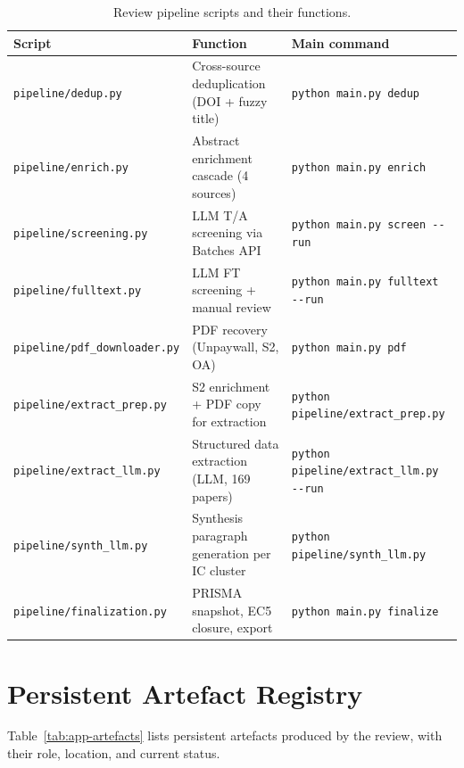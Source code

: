\begin{table}[htbp]
\centering
\caption{Review pipeline scripts and their functions.}
\label{tab:app-pipeline}
\small
\setlength{\tabcolsep}{3pt}
\begin{tabular}{p{3.5cm} p{4.0cm} p{5.2cm}}
\toprule
\textbf{Script} & \textbf{Function} & \textbf{Main command} \\
\midrule
\texttt{pipeline/dedup.py} &
  Cross-source deduplication (DOI + fuzzy title) &
  \texttt{python main.py dedup} \\
\texttt{pipeline/enrich.py} &
  Abstract enrichment cascade (4 sources) &
  \texttt{python main.py enrich} \\
\texttt{pipeline/screening.py} &
  LLM T/A screening via Batches API &
  \texttt{python main.py screen -{}-run} \\
\texttt{pipeline/fulltext.py} &
  LLM FT screening + manual review &
  \texttt{python main.py fulltext -{}-run} \\
\texttt{pipeline/pdf\_downloader.py} &
  PDF recovery (Unpaywall, S2, OA) &
  \texttt{python main.py pdf} \\
\texttt{pipeline/extract\_prep.py} &
  S2 enrichment + PDF copy for extraction &
  \texttt{python pipeline/extract\_prep.py} \\
\texttt{pipeline/extract\_llm.py} &
  Structured data extraction (LLM, 169 papers) &
  \texttt{python pipeline/extract\_llm.py -{}-run} \\
\texttt{pipeline/synth\_llm.py} &
  Synthesis paragraph generation per IC cluster &
  \texttt{python pipeline/synth\_llm.py} \\
\texttt{pipeline/finalization.py} &
  PRISMA snapshot, EC5 closure, export &
  \texttt{python main.py finalize} \\
\bottomrule
\end{tabular}
\end{table}

\section{Persistent Artefact Registry}
\label{app:slr-artefacts}

Table~\ref{tab:app-artefacts} lists persistent artefacts produced by the review,
with their role, location, and current status.

